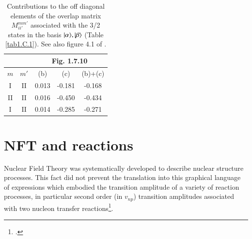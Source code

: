 \begin{subappendices}
\begin{table}
\end{table}
\begin{table}
\begin{tabular}{|c|c|c|c|c|}
\hline
\multicolumn{2}{|c}{ }& \multicolumn{3}{|c|}{Fig. 1.7.10} \\
\hline
$m$&$m'$  & (b) & (c) & (b)+(c)    \\
\hline
I & II  & 0.013 & -0.181 & -0.168    \\
II & II  & 0.016 & -0.450 & -0.434    \\
 I & II  & 0.014 & -0.285 & -0.271    \\
\hline
\end{tabular}\caption{Contributions to the off diagonal elements of the overlap matrix $M_{ii'}^{mm'}$ associated with the 3/2 states in the basis $|{\alpha} \rangle,|{\beta} \rangle$ (Table \ref{tab1.C.1}). See also figure 4.1 of \cite{Bortignon:77}.}\label{tab1.C.2}
\end{table}
\section{NFT and reactions}\label{App1.D}
Nuclear Field Theory was systematically developed to describe nuclear structure processes. This fact did not prevent the translation into this graphical language of expressions which embodied the transition amplitude of a variety of reaction processes, in particular second order (in $v_{np}$) transition amplitudes associated with two nucleon transfer reactions\footnote{\cite{Broglia:75}.}.



\end{subappendices}
